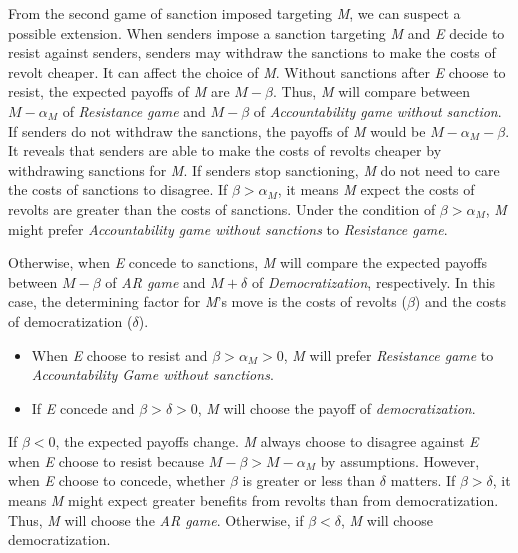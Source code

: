 \documentclass[11pt, letterpage]{article}
\begin{document}
From the second game of sanction imposed targeting \textit{M}, we can suspect a possible extension. When senders impose a sanction targeting \textit{M} and \textit{E} decide to resist against senders, senders may withdraw the sanctions to make the costs of revolt cheaper. It can affect the choice of \textit{M}. Without sanctions after \textit{E} choose to resist, the expected payoffs of \textit{M} are $M-\beta$. Thus, \textit{M} will compare between $M-\alpha_{M}$ of \textit{Resistance game} and $M-\beta$ of \textit{Accountability game without sanction}. If senders do not withdraw the sanctions, the payoffs of \textit{M} would be $M-\alpha_{M}-\beta$. It reveals that senders are able to make the costs of revolts cheaper by withdrawing sanctions for \textit{M}. If senders stop sanctioning, \textit{M} do not need to care the costs of sanctions to disagree. If $\beta > \alpha_{M}$, it means \textit{M} expect the costs of revolts are greater than the costs of sanctions. Under the condition of $\beta  > \alpha_{M}$, \textit{M} might prefer \textit{Accountability game without sanctions} to \textit{Resistance game}.

Otherwise, when \textit{E} concede to sanctions, \textit{M} will compare the expected payoffs between $M-\beta$ of \textit{AR game} and $M + \delta$ of \textit{Democratization}, respectively. In this case, the determining factor for \textit{M}'s move is the costs of revolts ($\beta$) and the costs of democratization ($\delta$).

\begin{itemize}
	\item When \textit{E} choose to resist and $\beta > \alpha_{M} > 0$, \textit{M} will prefer \textit{Resistance game} to \textit{Accountability Game without sanctions}.
	\item If \textit{E} concede and $\beta > \delta > 0$, \textit{M} will choose the payoff of \textit{democratization}.
\end{itemize}

If $\beta < 0$, the expected payoffs change. \textit{M} always choose to disagree against \textit{E} when \textit{E} choose to resist because $M-\beta > M-\alpha_{M}$ by assumptions. However, when \textit{E} choose to concede, whether $\beta$ is greater or less than $\delta$ matters. If $\beta > \delta$, it means \textit{M} might expect greater benefits from revolts than from democratization. Thus, \textit{M} will choose the \textit{AR game}. Otherwise, if $\beta < \delta$, \textit{M} will choose democratization.
\end{document}
